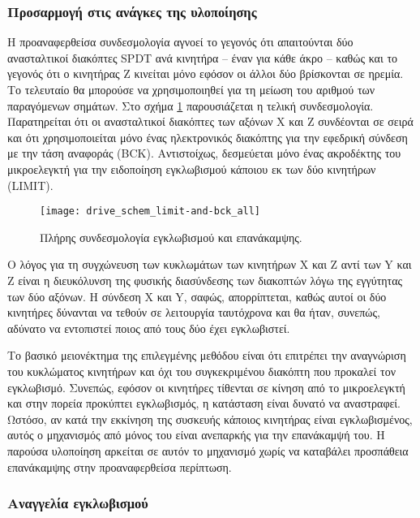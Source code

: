 \subsubsection{Προσαρμογή στις ανάγκες της υλοποίησης}

Η προαναφερθείσα συνδεσμολογία αγνοεί το γεγονός ότι απαιτούνται δύο
ανασταλτικοί διακόπτες SPDT ανά κινητήρα -- έναν για κάθε άκρο -- καθώς και το
γεγονός ότι ο κινητήρας Z κινείται μόνο εφόσον οι άλλοι δύο βρίσκονται σε
ηρεμία. Το τελευταίο θα μπορούσε να χρησιμοποιηθεί για τη μείωση του αριθμού των
παραγόμενων σημάτων. Στο σχήμα \ref{fig:motor:limit_switch_final} παρουσιάζεται
η τελική συνδεσμολογία. Παρατηρείται ότι οι ανασταλτικοί διακόπτες των αξόνων X
και Z συνδέονται σε σειρά και ότι χρησιμοποιείται μόνο ένας ηλεκτρονικός
διακόπτης για την εφεδρική σύνδεση με την τάση αναφοράς (BCK).
Αντιστοίχως, δεσμεύεται μόνο ένας ακροδέκτης του μικροελεγκτή για την ειδοποίηση
εγκλωβισμού κάποιου εκ των δύο κινητήρων (LIMIT).

\begin{figure}
    \caption{Πλήρης συνδεσμολογία εγκλωβισμού και επανάκαμψης.
    \label{fig:motor:limit_switch_final}}
    \begin{center}
    \texttt{[image: drive\_schem\_limit-and-bck\_all]}
    \end{center}
\end{figure}

Ο λόγος για τη συγχώνευση των κυκλωμάτων των κινητήρων X και Z αντί των Y και Z
είναι η διευκόλυνση της φυσικής διασύνδεσης των διακοπτών λόγω της εγγύτητας των
δύο αξόνων.
Η σύνδεση X και Y, σαφώς, απορρίπτεται, καθώς αυτοί οι δύο κινητήρες δύνανται να
τεθούν σε λειτουργία ταυτόχρονα και θα ήταν, συνεπώς, αδύνατο να εντοπιστεί
ποιος από τους δύο έχει εγκλωβιστεί.

Το βασικό μειονέκτημα της επιλεγμένης μεθόδου είναι ότι επιτρέπει την αναγνώριση
του κυκλώματος κινητήρων και όχι του συγκεκριμένου διακόπτη που προκαλεί τον
εγκλωβισμό. Συνεπώς, εφόσον οι κινητήρες τίθενται σε κίνηση από το μικροελεγκτή
και στην πορεία προκύπτει εγκλωβισμός, η κατάσταση είναι δυνατό να αναστραφεί.
Ωστόσο, αν κατά την εκκίνηση της συσκευής κάποιος κινητήρας είναι εγκλωβισμένος,
αυτός ο μηχανισμός από μόνος του είναι ανεπαρκής για την επανάκαμψή του. Η
παρούσα υλοποίηση αρκείται σε αυτόν το μηχανισμό χωρίς να καταβάλει προσπάθεια
επανάκαμψης στην προαναφερθείσα περίπτωση.

\subsubsection{Αναγγελία εγκλωβισμού}
\label{subsec:motor:limit-pin-change}

